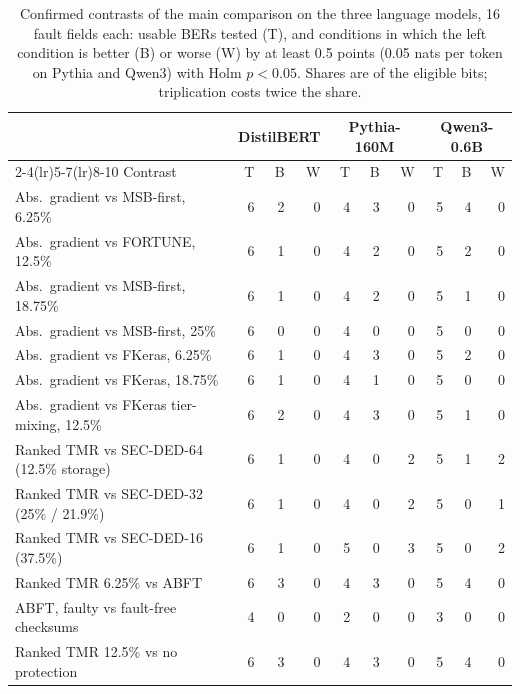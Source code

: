 \begin{table}[h]
\caption{Confirmed contrasts of the main comparison on the three language models, 16 fault fields each: usable BERs tested (T), and conditions in which the left condition is better (B) or worse (W) by at least 0.5 points (0.05 nats per token on Pythia and Qwen3) with Holm $p<0.05$. Shares are of the eligible bits; triplication costs twice the share.}\label{tab:contrastslm}
\centering\footnotesize\setlength{\tabcolsep}{3.2pt}
\begin{tabular}{l rrr rrr rrr}\toprule
 & \multicolumn{3}{c}{DistilBERT} & \multicolumn{3}{c}{Pythia-160M} & \multicolumn{3}{c}{Qwen3-0.6B}\\\cmidrule(lr){2-4}\cmidrule(lr){5-7}\cmidrule(lr){8-10}
Contrast & T & B & W & T & B & W & T & B & W\\\midrule
Abs.\ gradient vs MSB-first, 6.25\% & 6 & 2 & 0 & 4 & 3 & 0 & 5 & 4 & 0\\
Abs.\ gradient vs FORTUNE, 12.5\% & 6 & 1 & 0 & 4 & 2 & 0 & 5 & 2 & 0\\
Abs.\ gradient vs MSB-first, 18.75\% & 6 & 1 & 0 & 4 & 2 & 0 & 5 & 1 & 0\\
Abs.\ gradient vs MSB-first, 25\% & 6 & 0 & 0 & 4 & 0 & 0 & 5 & 0 & 0\\
Abs.\ gradient vs FKeras, 6.25\% & 6 & 1 & 0 & 4 & 3 & 0 & 5 & 2 & 0\\
Abs.\ gradient vs FKeras, 18.75\% & 6 & 1 & 0 & 4 & 1 & 0 & 5 & 0 & 0\\
Abs.\ gradient vs FKeras tier-mixing, 12.5\% & 6 & 2 & 0 & 4 & 3 & 0 & 5 & 1 & 0\\\midrule
Ranked TMR vs SEC-DED-64 (12.5\% storage) & 6 & 1 & 0 & 4 & 0 & 2 & 5 & 1 & 2\\
Ranked TMR vs SEC-DED-32 (25\% / 21.9\%) & 6 & 1 & 0 & 4 & 0 & 2 & 5 & 0 & 1\\
Ranked TMR vs SEC-DED-16 (37.5\%) & 6 & 1 & 0 & 5 & 0 & 3 & 5 & 0 & 2\\
Ranked TMR 6.25\% vs ABFT & 6 & 3 & 0 & 4 & 3 & 0 & 5 & 4 & 0\\
ABFT, faulty vs fault-free checksums & 4 & 0 & 0 & 2 & 0 & 0 & 3 & 0 & 0\\
Ranked TMR 12.5\% vs no protection & 6 & 3 & 0 & 4 & 3 & 0 & 5 & 4 & 0\\\bottomrule
\end{tabular}
\end{table}

